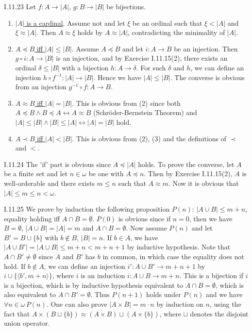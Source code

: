 \documentclass[12pt]{article}
\begin{document}
\begin{customthm}{I.11.23}
  Let $f:A\rightarrow|A|$, $g:B\rightarrow|B|$ be bijections.
  \begin{enumerate}
    \item\underline{$|A|$ is a cardinal}. Assume not and let $\xi$ be an ordinal such that $\xi<|A|$ and $\xi\approx|A|$. Then $A\approx\xi$ holds by $A\approx|A|$, contradicting the minimality of $|A|$.
    \item\underline{$A\preccurlyeq B$ iff $|A|\leq|B|$}. Assume $A\preccurlyeq B$ and let $i:A\rightarrow B$ be an injection. Then $g\circ i:A\rightarrow|B|$ is an injection, and by Exercise I.11.15(2), there exists an ordinal $\delta\leq|B|$ with a bijection $h:A\rightarrow\delta$. For such $\delta$ and $h$, we can define an injection $h\circ f^{-1}:|A|\rightarrow|B|$. Hence we have $|A|\leq|B|$. The converse is obvious from an injection $g^{-1}\circ f:A\rightarrow B$.
    \item\underline{$A\approx B$ iff $|A|=|B|$}. This is obvious from (2) since both $A\preccurlyeq B\wedge B\preccurlyeq A\leftrightarrow A\approx B$ (Schröder-Bernstein Theorem) and $|A|\leq|B|\wedge|B|\leq|A|\leftrightarrow|A|=|B|$ hold.
    \item\underline{$A\prec B$ iff $|A|<|B|$}. This is obvious from (2), (3) and the definitions of $\prec$ and $<$.
  \end{enumerate}
\end{customthm}

\begin{customthm}{I.11.24}
  The 'if' part is obvious since $A\preccurlyeq|A|$ holds. To prove the converse, let $A$ be a finite set and let $n\in\omega$ be one with $A\preccurlyeq n$. Then by Exercise I.11.15(2), $A$ is well-orderable and there exists $m\leq n$ such that $A\approx m$. Now it is obvious that $|A|\leq m\leq n<\omega$.
\end{customthm}

\begin{customthm}{I.11.25}
  We prove by induction the following proposition $P(n)$: $|A\cup B|\leq m+n$, equality holding iff $A\cap B=\emptyset$. $P(0)$ is obvious since if $n=0$, then we have $B=\emptyset$, $|A\cup B|=|A|=m$ and $A\cap B=\emptyset$. Now assume $P(n)$ and let $B'=B\cup\{b\}$ with $b\not\in B$, $|B|=n$. If $b\in A$, we have $|A\cup B'|=|A\cup B|\leq m+n<m+n+1$ by inductive hypothesis. Note that $A\cap B'\neq\emptyset$ since $A$ and $B'$ has $b$ in common, in which case the equality does not hold. If $b\not\in A$, we can define an injection $i':A\cup B'\rightarrow m+n+1$ by $i\cup\{\langle b',m+n\rangle\}$, where $i$ is an induction $i:A\cup B\rightarrow m+n$. This is a bijection if $i$ is a bijection, which is by inductive hypothesis equivalent to $A\cap B=\emptyset$, which is also equivalent to $A\cap B'=\emptyset$. Thus $P(n+1)$ holds under $P(n)$ and we have $\forall n\in\omega\,P(n)$. One can also prove $|A\times B|=m\cdot n$ by induction on $n$, using the fact that $A\times (B\sqcup\{b\})\approx(A\times B)\sqcup(A\times\{b\})$, where $\sqcup$ denotes the disjoint union operator.
\end{customthm}
\end{document}
